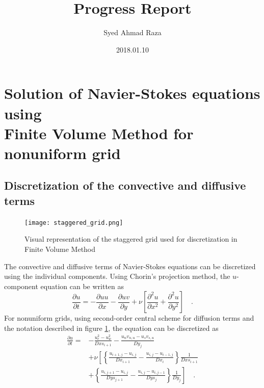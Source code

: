\documentclass[12pt,a4paper,fleqn]{article}
\title{Progress Report}
\author{Syed Ahmad Raza}
\date{2018.01.10}
\begin{document}
\maketitle
\pagebreak

\section{Solution of Navier-Stokes equations using\\
    Finite Volume Method for nonuniform grid}

\subsection{Discretization of the convective and diffusive terms}

\begin{figure}[H]
    \centering
    \texttt{[image: staggered\_grid.png]}
    \caption{Visual representation of the staggered grid used for discretization in Finite Volume Method}
    \label{fig:staggered-grid}
\end{figure}

The convective and diffusive terms of Navier-Stokes equations can be discretized using the individual components. Using Chorin's projection method, the $u$-component equation can be written as
\begin{equation} \label{eq:convective-diffusive-u}
\frac{\partial u}{\partial t} = -\frac{\partial uu}{\partial x} -\frac{\partial uv}{\partial y} + \nu\left[\frac{\partial^2u}{\partial x^2} + \frac{\partial^2u}{\partial y^2}\right] \quad.
\end{equation}
For nonuniform grids, using second-order central scheme for diffusion terms and the notation described in figure \ref{fig:staggered-grid}, the equation can be discretized as
\begin{align}\label{eq:discretized_convective-diffusive-u}
    \frac{\partial u}{\partial t} =
    {}& - \frac{u_e^2 - u_w^2}{Dxs_{i+1}} - \frac{u_n v_{n,u} - u_s v_{s,u}}{Dy_j}
    \nonumber\\
    &+ \nu\left[
    \left\{
    \frac{u_{i+1,j}-u_{i,j}}{Dx_{i+1}}
    - \frac{u_{i,j}-u_{i-1,j}}{Dx_i}
    \right\}
    \frac{1}{Dxs_{i+1}}
    \right.\nonumber\\
    & \left. + \left\{
    \frac{u_{i,j+1}-u_{i,j}}{Dys_{j+1}}
    - \frac{u_{i,j}-u_{i,j-1}}{Dys_j}
    \right\}
    \frac{1}{Dy_j}
    \right] \quad .
\end{align}
\end{document}
